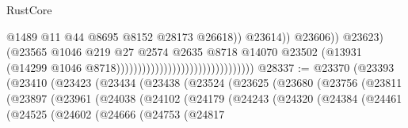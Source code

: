 \begin{lexlean}{RustCore}
\begin{coremodule}
                                                                            @1489
                                                                            @11
                                                                            @44
                                                                            @8695
                                                                            @8152
                                                                            @28173
                                                                            @26618))
                                                                        @23614))
                                                                    @23606))
                                                                @23623)
                                                              (@23565
                                                                @1046
                                                                @219
                                                                @27
                                                                @2574
                                                                @2635
                                                                @8718
                                                                @14070
                                                                @23502
                                                                (@13931
                                                                  (@14299
                                                                    @1046
                                                                    @8718))))))))))))))))))))))))))))))))
@28337 := @23370
    (@23393
      (@23410
        (@23423
          (@23434
            (@23438
              (@23524
                (@23625
                  (@23680
                    (@23756
                      (@23811
                        (@23897
                          (@23961
                            (@24038
                              (@24102
                                (@24179
                                  (@24243
                                    (@24320
                                      (@24384
                                        (@24461
                                          (@24525
                                            (@24602
                                              (@24666
                                                (@24753
                                                  (@24817

\end{coremodule}
\end{lexlean}
